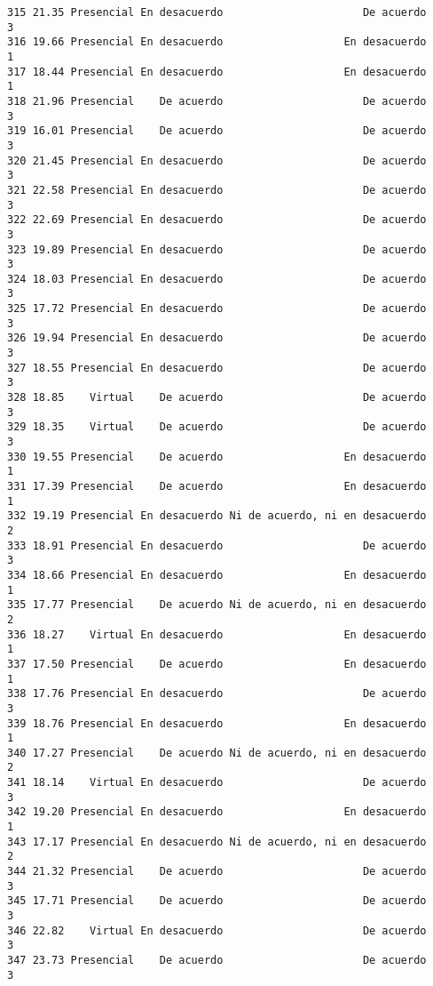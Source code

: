 \documentclass[
  letterpaper,
  DIV=11,
  numbers=noendperiod]{scrartcl}
\begin{document}
\begin{verbatim}
315 21.35 Presencial En desacuerdo                      De acuerdo           3
316 19.66 Presencial En desacuerdo                   En desacuerdo           1
317 18.44 Presencial En desacuerdo                   En desacuerdo           1
318 21.96 Presencial    De acuerdo                      De acuerdo           3
319 16.01 Presencial    De acuerdo                      De acuerdo           3
320 21.45 Presencial En desacuerdo                      De acuerdo           3
321 22.58 Presencial En desacuerdo                      De acuerdo           3
322 22.69 Presencial En desacuerdo                      De acuerdo           3
323 19.89 Presencial En desacuerdo                      De acuerdo           3
324 18.03 Presencial En desacuerdo                      De acuerdo           3
325 17.72 Presencial En desacuerdo                      De acuerdo           3
326 19.94 Presencial En desacuerdo                      De acuerdo           3
327 18.55 Presencial En desacuerdo                      De acuerdo           3
328 18.85    Virtual    De acuerdo                      De acuerdo           3
329 18.35    Virtual    De acuerdo                      De acuerdo           3
330 19.55 Presencial    De acuerdo                   En desacuerdo           1
331 17.39 Presencial    De acuerdo                   En desacuerdo           1
332 19.19 Presencial En desacuerdo Ni de acuerdo, ni en desacuerdo           2
333 18.91 Presencial En desacuerdo                      De acuerdo           3
334 18.66 Presencial En desacuerdo                   En desacuerdo           1
335 17.77 Presencial    De acuerdo Ni de acuerdo, ni en desacuerdo           2
336 18.27    Virtual En desacuerdo                   En desacuerdo           1
337 17.50 Presencial    De acuerdo                   En desacuerdo           1
338 17.76 Presencial En desacuerdo                      De acuerdo           3
339 18.76 Presencial En desacuerdo                   En desacuerdo           1
340 17.27 Presencial    De acuerdo Ni de acuerdo, ni en desacuerdo           2
341 18.14    Virtual En desacuerdo                      De acuerdo           3
342 19.20 Presencial En desacuerdo                   En desacuerdo           1
343 17.17 Presencial En desacuerdo Ni de acuerdo, ni en desacuerdo           2
344 21.32 Presencial    De acuerdo                      De acuerdo           3
345 17.71 Presencial    De acuerdo                      De acuerdo           3
346 22.82    Virtual En desacuerdo                      De acuerdo           3
347 23.73 Presencial    De acuerdo                      De acuerdo           3

\end{verbatim}
\end{document}
